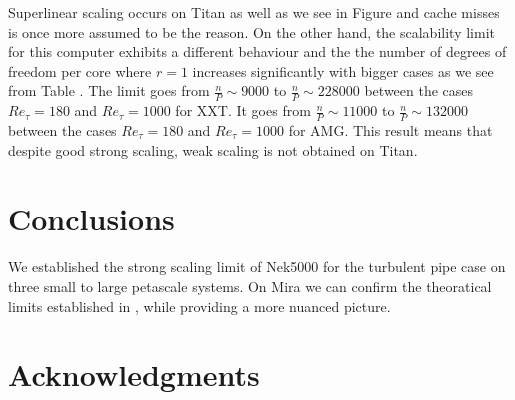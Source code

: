 \documentclass{sig-alternate}
\begin{document}

Superlinear scaling occurs on Titan as well as we see in Figure  and cache misses is once more assumed to be the reason. On the other hand, the scalability limit for this computer exhibits a different behaviour and the the number of degrees of freedom per core where $r=1$ increases significantly with bigger cases as we see from Table . The limit goes from $\frac{n}{P} \sim 9000$ to $\frac{n}{P} \sim 228000$ between the cases $Re_{\tau}=180$ and $Re_{\tau}=1000$ for XXT. It goes from $\frac{n}{P} \sim 11000$ to $\frac{n}{P} \sim 132000$ between the cases $Re_{\tau}=180$ and $Re_{\tau}=1000$ for AMG. This result means that despite good strong scaling, weak scaling is not obtained on Titan.


\section{Conclusions}
We established the strong scaling limit of Nek5000 for the turbulent pipe case
on three small to large petascale systems. On Mira we can confirm the
theoratical limits established in \cite{fischer:scaling}, while providing a more
nuanced picture. 

\section{Acknowledgments}

%

%
%

\end{document}
